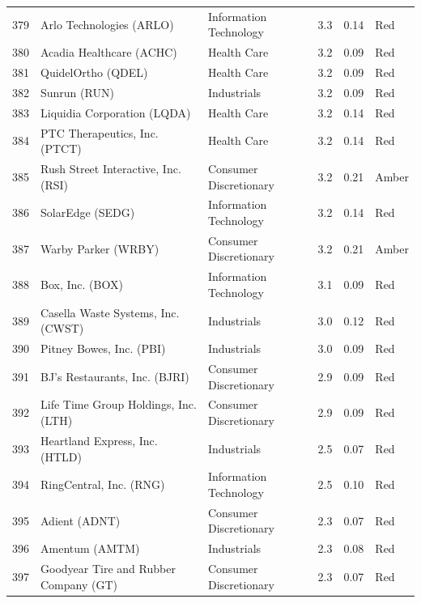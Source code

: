 \documentclass[11pt,a4paper]{article}
\begin{document}
{\begin{longtable}{r p{4.6cm} p{3cm} r r l}
379 & Arlo Technologies (ARLO) & Information Technology & 3.3 & 0.14 & \cellcolor[HTML]{F4B6B6}Red \\
380 & Acadia Healthcare (ACHC) & Health Care & 3.2 & 0.09 & \cellcolor[HTML]{F4B6B6}Red \\
381 & QuidelOrtho (QDEL) & Health Care & 3.2 & 0.09 & \cellcolor[HTML]{F4B6B6}Red \\
382 & Sunrun (RUN) & Industrials & 3.2 & 0.09 & \cellcolor[HTML]{F4B6B6}Red \\
383 & Liquidia Corporation (LQDA) & Health Care & 3.2 & 0.14 & \cellcolor[HTML]{F4B6B6}Red \\
384 & PTC Therapeutics, Inc. (PTCT) & Health Care & 3.2 & 0.14 & \cellcolor[HTML]{F4B6B6}Red \\
385 & Rush Street Interactive, Inc. (RSI) & Consumer Discretionary & 3.2 & 0.21 & \cellcolor[HTML]{FFEB9C}Amber \\
386 & SolarEdge (SEDG) & Information Technology & 3.2 & 0.14 & \cellcolor[HTML]{F4B6B6}Red \\
387 & Warby Parker (WRBY) & Consumer Discretionary & 3.2 & 0.21 & \cellcolor[HTML]{FFEB9C}Amber \\
388 & Box, Inc. (BOX) & Information Technology & 3.1 & 0.09 & \cellcolor[HTML]{F4B6B6}Red \\
389 & Casella Waste Systems, Inc. (CWST) & Industrials & 3.0 & 0.12 & \cellcolor[HTML]{F4B6B6}Red \\
390 & Pitney Bowes, Inc. (PBI) & Industrials & 3.0 & 0.09 & \cellcolor[HTML]{F4B6B6}Red \\
391 & BJ's Restaurants, Inc. (BJRI) & Consumer Discretionary & 2.9 & 0.09 & \cellcolor[HTML]{F4B6B6}Red \\
392 & Life Time Group Holdings, Inc. (LTH) & Consumer Discretionary & 2.9 & 0.09 & \cellcolor[HTML]{F4B6B6}Red \\
393 & Heartland Express, Inc. (HTLD) & Industrials & 2.5 & 0.07 & \cellcolor[HTML]{F4B6B6}Red \\
394 & RingCentral, Inc. (RNG) & Information Technology & 2.5 & 0.10 & \cellcolor[HTML]{F4B6B6}Red \\
395 & Adient (ADNT) & Consumer Discretionary & 2.3 & 0.07 & \cellcolor[HTML]{F4B6B6}Red \\
396 & Amentum (AMTM) & Industrials & 2.3 & 0.08 & \cellcolor[HTML]{F4B6B6}Red \\
397 & Goodyear Tire and Rubber Company (GT) & Consumer Discretionary & 2.3 & 0.07 & \cellcolor[HTML]{F4B6B6}Red \\

\end{longtable}}
\end{document}

